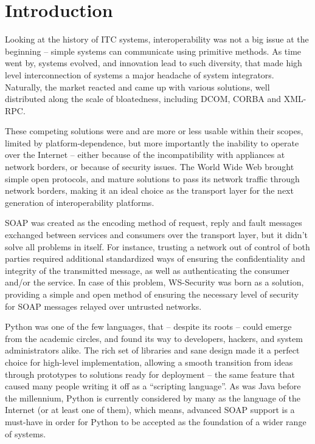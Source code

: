 
\chapter*{Introduction}


Looking at the history of ITC systems, interoperability was not a big issue at the beginning -- simple systems can communicate using primitive methods. As time went by, systems evolved, and innovation lead to such diversity, that made high level interconnection of systems a major headache of system integrators. Naturally, the market reacted and came up with various solutions, well distributed along the scale of bloatedness, including DCOM, CORBA and XML-RPC.

These competing solutions were and are more or less usable within their scopes, limited by platform-dependence, but more importantly the inability to operate over the Internet -- either because of the incompatibility with appliances at network borders, or because of security issues. The World Wide Web brought simple open protocols, and mature solutions to pass its network traffic through network borders, making it an ideal choice as the transport layer for the next generation of interoperability platforms.

SOAP was created as the encoding method of request, reply and fault messages exchanged between services and consumers over the transport layer, but it didn't solve all problems in itself. For instance, trusting a network out of control of both parties required additional standardized ways of ensuring the confidentiality and integrity of the transmitted message, as well as authenticating the consumer and/or the service. In case of this problem, WS\hyp{}Security was born as a solution, providing a simple and open method of ensuring the necessary level of security for SOAP messages relayed over untrusted networks.

Python was one of the few languages, that -- despite its roots -- could emerge from the academic circles, and found its way to developers, hackers, and system administrators alike. The rich set of libraries and sane design made it a perfect choice for high-level implementation, allowing a smooth transition from ideas through prototypes to solutions ready for deployment -- the same feature that caused many people writing it off as a ``scripting language''. As was Java before the millennium, Python is currently considered by many as the language of the Internet (or at least one of them), which means, advanced SOAP support is a must-have in order for Python to be accepted as the foundation of a wider range of systems.

